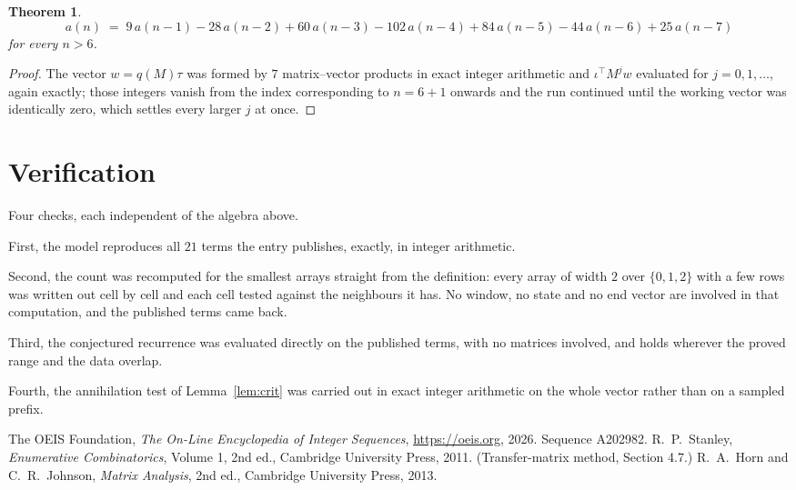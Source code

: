\documentclass[11pt,a4paper]{article}
\theoremstyle{plain}
\newtheorem{theorem}{Theorem}
\theoremstyle{definition}
\begin{document}
\begin{theorem}
\[
a(n)\;=\;9\,a(n-1) - 28\,a(n-2) + 60\,a(n-3) - 102\,a(n-4) + 84\,a(n-5) - 44\,a(n-6) + 25\,a(n-7)
\]
for every $n>6$.
\end{theorem}

\begin{proof}
The vector $w=q(M)\tau$ was formed by $7$ matrix--vector products in exact integer
arithmetic and $\iota^{\!\top}M^{j}w$ evaluated for $j=0,1,\dots$, again exactly; those
integers vanish from the index corresponding to $n=6+1$ onwards and the run continued
until the working vector was identically zero, which settles every larger $j$ at once.
\end{proof}

\section{Verification}

Four checks, each independent of the algebra above.

First, the model reproduces all $21$ terms the entry publishes, exactly, in integer
arithmetic.

Second, the count was recomputed for the smallest arrays straight from the definition: every
array of width $2$ over $\{0,1,2\}$ with a few rows was written out cell by cell and each cell
tested against the neighbours it has. No window, no state and no end vector are involved in that
computation, and the published terms came back.

Third, the conjectured recurrence was evaluated directly on the published terms, with no
matrices involved, and holds wherever the proved range and the data overlap.

Fourth, the annihilation test of Lemma~\ref{lem:crit} was carried out in exact integer
arithmetic on the whole vector rather than on a sampled prefix.

\begin{thebibliography}{9}
 The OEIS Foundation, \emph{The On-Line Encyclopedia of Integer
Sequences}, \url{https://oeis.org}, 2026. Sequence A202982.
 R.~P.~Stanley, \emph{Enumerative Combinatorics}, Volume 1, 2nd ed.,
Cambridge University Press, 2011. (Transfer-matrix method, Section 4.7.)
 R.~A.~Horn and C.~R.~Johnson, \emph{Matrix Analysis}, 2nd ed., Cambridge
University Press, 2013.
\end{thebibliography}
\end{document}
